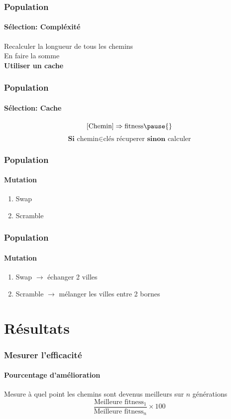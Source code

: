 \documentclass{beamer}
\begin{document}
\begin{frame}
  \frametitle{Population}
  \framesubtitle{Sélection: Compléxité}
  Recalculer la longueur de tous les chemins \\
  En faire la somme \\ \pause{}
  \textbf{Utiliser un cache}
\end{frame}

\begin{frame}[fragile]
  \frametitle{Population}
  \framesubtitle{Sélection: Cache}
  \[
    [\text{Chemin}] \Rightarrow \text{fitness} \pause{}
  \]
  \[
   \textbf{Si } \text{chemin} \in \text{clés} \text{ récuperer } \textbf{sinon} \text{ calculer}
  \]
\end{frame}

\begin{frame}
  \frametitle{Population}
  \framesubtitle{Mutation}
  \begin{enumerate}
    \item Swap
    \item Scramble
  \end{enumerate}
\end{frame}

\begin{frame}
  \frametitle{Population}
  \framesubtitle{Mutation}
  \begin{enumerate}
    \item Swap \pause{} $\rightarrow$ échanger 2 villes
    \item Scramble \pause{} $\rightarrow$ mélanger les villes entre 2 bornes
  \end{enumerate}
\end{frame}

\section{Résultats}
\begin{frame}
  \frametitle{Mesurer l'efficacité}
  \framesubtitle{Pourcentage d'amélioration}
  \centering
  Mesure à quel point les chemins sont devenus meilleurs sur $n$ générations \pause{}
  \[
    \frac{\text{Meilleure fitness}_1}{\text{Meilleure fitness}_n} \times 100
  \]
\end{frame}
\end{document}
